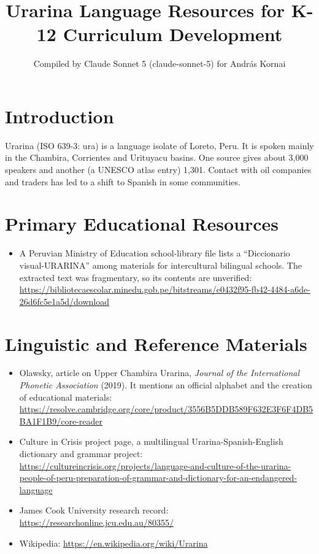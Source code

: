 \documentclass[12pt]{article}
\title{Urarina Language Resources for K-12 Curriculum Development}
\author{Compiled by Claude Sonnet 5 (claude-sonnet-5) for Andr\'as Kornai}
\date{}
\begin{document}
\maketitle

\section{Introduction}
Urarina (ISO 639-3: ura) is a language isolate of Loreto, Peru. It is spoken mainly in the Chambira, Corrientes and Urituyacu basins. One source gives about 3,000 speakers and another (a UNESCO atlas entry) 1,301. Contact with oil companies and traders has led to a shift to Spanish in some communities.

\section{Primary Educational Resources}
\begin{itemize}
\item A Peruvian Ministry of Education school-library file lists a ``Diccionario visual-URARINA'' among materials for intercultural bilingual schools. The extracted text was fragmentary, so its contents are unverified: \url{https://bibliotecaescolar.minedu.gob.pe/bitstreams/e0432f95-fb42-4484-a6de-26d6fc5e1a5d/download}
\end{itemize}

\section{Linguistic and Reference Materials}
\begin{itemize}
\item Olawsky, article on Upper Chambira Urarina, \emph{Journal of the International Phonetic Association} (2019). It mentions an official alphabet and the creation of educational materials: \url{https://resolve.cambridge.org/core/product/3556B5DDB589F632E3F6F4DB5BA1F1B9/core-reader}
\item Culture in Crisis project page, a multilingual Urarina-Spanish-English dictionary and grammar project: \url{https://cultureincrisis.org/projects/language-and-culture-of-the-urarina-people-of-peru-preparation-of-grammar-and-dictionary-for-an-endangered-language}
\item James Cook University research record: \url{https://researchonline.jcu.edu.au/80355/}
\item Wikipedia: \url{https://en.wikipedia.org/wiki/Urarina}
\end{itemize}
\end{document}
